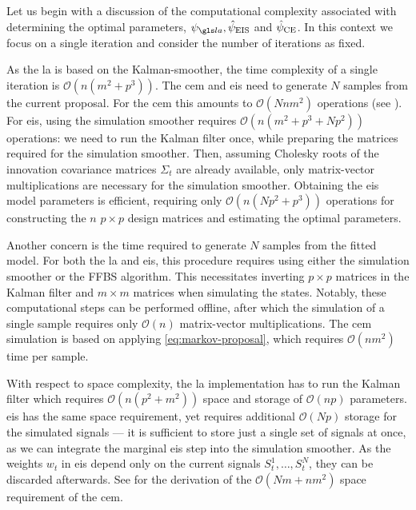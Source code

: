 Let us begin with a discussion of the computational complexity associated with determining the optimal parameters, $\psi_{\la}, \hat\psi_{\eis}$ and $\hat\psi_{{\text{CE}}}$. In this context we focus on a single iteration and consider the number of iterations as fixed.

As the \gls{la} is based on the Kalman-smoother, the time complexity of a single iteration is $\mathcal O(n(m^{2} + p^{3}))$. The \gls{cem} and \gls{eis} need to generate $N$ samples from the current proposal. For the \gls{cem} this amounts to $\mathcal O(Nn m^{2})$ operations (see ). For \gls{eis}, using the simulation smoother \citep{Durbin2002Simple} requires $\mathcal O (n(m^{2} + p^{3} + Np^2))$ operations: we need to run the Kalman filter once, while preparing the matrices required for the simulation smoother. Then, assuming Cholesky roots of the innovation covariance matrices $\Sigma_{t}$ are already available, only matrix-vector multiplications are necessary for the simulation smoother. Obtaining the \gls{eis} model parameters is efficient, requiring only $\mathcal O(n(Np^2 + p^{3}))$ operations for constructing the $n$ $p\times p$ design matrices and estimating the optimal parameters. 

Another concern is the time required to generate $N$ samples from the fitted model. For both the \gls{la} and \gls{eis}, this procedure requires using either the simulation smoother or the FFBS algorithm. This necessitates inverting $p\times p$ matrices in the Kalman filter and $m \times m$ matrices when simulating the states. Notably, these computational steps can be performed offline, after which the simulation of a single sample requires only $\mathcal O(n)$ matrix-vector multiplications. The \gls{cem} simulation is based on applying \eqref{eq:markov-proposal}, which requires $\mathcal O(nm^{2})$ time per sample. 

With respect to space complexity, the \gls{la} implementation has to run the Kalman filter which requires $\mathcal O(n (p^{2} + m^{2}))$ space and storage of $\mathcal O(n p)$ parameters. 
\gls{eis} has the same space requirement, yet requires additional $\mathcal O(Np)$ storage for the simulated signals --- it is sufficient to store just a single set of signals at once, as we can integrate the marginal \gls{eis} step into the simulation smoother. As the weights $w_{t}$ in \gls{eis} depend only on the current signals $S^{1}_{t}, \dots, S^{N}_{t}$, they can be discarded afterwards. See  for the derivation of the $\mathcal O(Nm + nm^{2})$ space requirement of the \gls{cem}.

